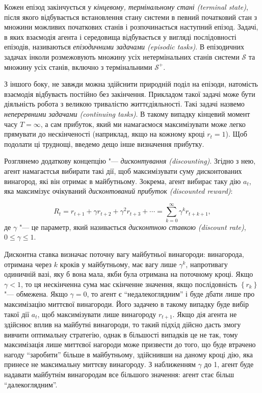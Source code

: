 Кожен епізод закінчується у \emph{кінцевому, термінальному стані (terminal state)}, після якого відбувається встановлення стану системи в певний початковий стан з множини можливих початкових станів і розпочинається наступний епізод. Задачі, в яких взаємодія агента і середовища відбувається у вигляді послідовності епізодів, називаються \emph{епізодичними задачами (episodic tasks)}. В епізодичних задачах інколи розмежовують множину усіх нетермінальних станів системи $\mathcal{S}$ та множину усіх станів, включно з термінальними $\mathcal{S^+}$.

З іншого боку, не завжди можна здійснити природній поділ на епізоди, натомість взаємодія відбуваєть постійно без закінчення. Прикладом такої задачі може бути діяльність робота з великою тривалістю життєдіяльності. Такі задачі назвемо \emph{неперервними задачами (continuing tasks)}. В такому випадку кінцевий момент часу $T=\infty$, а сам прибуток, який ми намагаємося максимізувати може легко прямувати до нескінченості (наприклад, якщо на кожному кроці $r_t=1$). Щоб подолати ці труднощі, введемо дещо інше визначення прибутку.

Розглянемо додаткову концепцію "--- \emph{дисконтування (discounting)}. Згідно з нею, агент намагаєтсья вибирати такі дії, щоб максимізувати суму дисконтованих винагород, які він отримає в майбутньому. Зокрема, агент вибирає таку дію $a_t$, яка максимізує очікуваний \emph{дисконтований прибуток (discounted reward)}:

\begin{equation}
R_t = r_{t+1} + \gamma r_{t+2} + \gamma^2 r_{t+3} + \cdots = \sum_{k=0}^{\infty}\gamma^k r_{t+k+1},
\end{equation}
де $\gamma$ "--- це параметр, який називається \emph{дисконтною ставкою (discount rate)}, $0\leq\gamma\leq 1$.

Дисконтна ставка визначає поточну вагу майбутньої винагороди: винагорода, отримана через $k$ кроків у майбутньому, має вагу лише $\gamma^k$, напротивагу одиничній вазі, яку б вона мала, якби була отримана на поточному кроці. Якщо $\gamma<1$, то ця нескінченна сума має скінченне значення, якщо послідовність $\left\{r_k\right\}$ "--- обмежена. Якщо $\gamma = 0$, то агент є ``недалекоглядним'' і буде дбати лише про максимізацію миттєвої винагороди. Його задачею в такому випадку буде вибір такої дії $a_t$, щоб максимізувати лише винагороду $r_{t+1}$. Якщо дія агента не здійснює вплив на майбутні винагороди, то такий підхід дійсно дасть змогу вивчити оптимальну стратегію, однак в більшості випадків це не так, тому максимізація лише миттєвої нагороди може призвести до того, що буде втрачено нагоду ``заробити'' більше в майбутньому, здійснивши на даному кроці дію, яка принесе не максимальну миттєву винагороду. З наближенням $\gamma$ до 1, агент буде надавати майбутнім винагородам все більшого значення: агент стає більш ``далекоглядним''.

